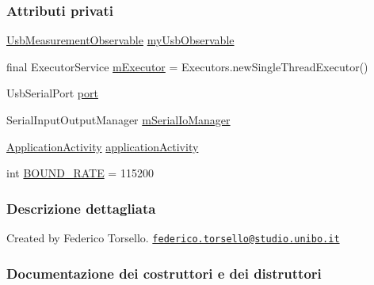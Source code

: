 \subsubsection*{Attributi privati}
\begin{DoxyCompactItemize}
\item 
\hyperlink{classit_1_1unibo_1_1torsello_1_1bluetoothpositioning_1_1observables_1_1UsbMeasurementObservable}{Usb\+Measurement\+Observable} \hyperlink{classit_1_1unibo_1_1torsello_1_1bluetoothpositioning_1_1util_1_1UsbUtil_a1c500d0f1a3f3a11b16015acc49929e0_a1c500d0f1a3f3a11b16015acc49929e0}{my\+Usb\+Observable}
\item 
final Executor\+Service \hyperlink{classit_1_1unibo_1_1torsello_1_1bluetoothpositioning_1_1util_1_1UsbUtil_a0b5ea6576e2234b8f7a43343b598d637_a0b5ea6576e2234b8f7a43343b598d637}{m\+Executor} = Executors.\+new\+Single\+Thread\+Executor()
\item 
Usb\+Serial\+Port \hyperlink{classit_1_1unibo_1_1torsello_1_1bluetoothpositioning_1_1util_1_1UsbUtil_a49aef08510b6d48d627670d834099c36_a49aef08510b6d48d627670d834099c36}{port}
\item 
Serial\+Input\+Output\+Manager \hyperlink{classit_1_1unibo_1_1torsello_1_1bluetoothpositioning_1_1util_1_1UsbUtil_aba070ed30c34ed6fd900b30452817b4b_aba070ed30c34ed6fd900b30452817b4b}{m\+Serial\+Io\+Manager}
\item 
\hyperlink{classit_1_1unibo_1_1torsello_1_1bluetoothpositioning_1_1activities_1_1ApplicationActivity}{Application\+Activity} \hyperlink{classit_1_1unibo_1_1torsello_1_1bluetoothpositioning_1_1util_1_1UsbUtil_afdcd78c04f043fafe29eb2cc006b5843_afdcd78c04f043fafe29eb2cc006b5843}{application\+Activity}
\item 
int \hyperlink{classit_1_1unibo_1_1torsello_1_1bluetoothpositioning_1_1util_1_1UsbUtil_aa1f09cbe9b44a01d9e8e85d2dfe48654_aa1f09cbe9b44a01d9e8e85d2dfe48654}{B\+O\+U\+N\+D\+\_\+\+R\+A\+TE} = 115200
\end{DoxyCompactItemize}


\subsubsection{Descrizione dettagliata}
Created by Federico Torsello. \href{mailto:federico.torsello@studio.unibo.it}{\tt federico.\+torsello@studio.\+unibo.\+it} 

\subsubsection{Documentazione dei costruttori e dei distruttori}
\hypertarget{classit_1_1unibo_1_1torsello_1_1bluetoothpositioning_1_1util_1_1UsbUtil_aff938c0dddb8fd4549b0a3dddba94473_aff938c0dddb8fd4549b0a3dddba94473}{}\label{classit_1_1unibo_1_1torsello_1_1bluetoothpositioning_1_1util_1_1UsbUtil_aff938c0dddb8fd4549b0a3dddba94473_aff938c0dddb8fd4549b0a3dddba94473} 
